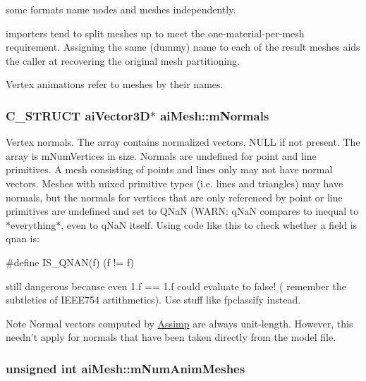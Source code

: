 \begin{DoxyItemize}
\item some formats name nodes and meshes independently.
\item importers tend to split meshes up to meet the one-\/material-\/per-\/mesh requirement. \-Assigning the same (dummy) name to each of the result meshes aids the caller at recovering the original mesh partitioning.
\item \-Vertex animations refer to meshes by their names. 
\end{DoxyItemize}\hypertarget{structaiMesh_aec81b496b4d93838cef038933dabe9b9}{
\subsubsection[{m\-Normals}]{\setlength{\rightskip}{0pt plus 5cm}\-C\-\_\-\-S\-T\-R\-U\-C\-T {\bf ai\-Vector3\-D}$\ast$ {\bf ai\-Mesh\-::m\-Normals}}}\label{structaiMesh_aec81b496b4d93838cef038933dabe9b9}
\-Vertex normals. \-The array contains normalized vectors, \-N\-U\-L\-L if not present. \-The array is m\-Num\-Vertices in size. \-Normals are undefined for point and line primitives. \-A mesh consisting of points and lines only may not have normal vectors. \-Meshes with mixed primitive types (i.\-e. lines and triangles) may have normals, but the normals for vertices that are only referenced by point or line primitives are undefined and set to \-Q\-Na\-N (\-W\-A\-R\-N\-: q\-Na\-N compares to inequal to $\ast$everything$\ast$, even to q\-Na\-N itself. \-Using code like this to check whether a field is qnan is\-: 
\begin{DoxyCode}
 #define IS_QNAN(f) (f != f)
\end{DoxyCode}
 still dangerous because even 1.\-f == 1.\-f could evaluate to false! ( remember the subtleties of \-I\-E\-E\-E754 artithmetics). \-Use stuff like {\ttfamily fpclassify} instead. \begin{DoxyNote}{\-Note}
\-Normal vectors computed by \hyperlink{namespaceAssimp}{\-Assimp} are always unit-\/length. \-However, this needn't apply for normals that have been taken directly from the model file. 
\end{DoxyNote}
\hypertarget{structaiMesh_a1692a300222b32348ae51779df4a697e}{
\subsubsection[{m\-Num\-Anim\-Meshes}]{\setlength{\rightskip}{0pt plus 5cm}unsigned int {\bf ai\-Mesh\-::m\-Num\-Anim\-Meshes}}}\label{structaiMesh_a1692a300222b32348ae51779df4a697e}
